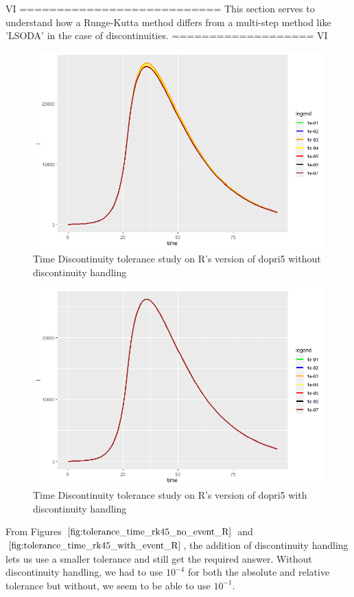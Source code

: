 VI ===========================
This section serves to understand how a Runge-Kutta method differs from a multi-step method like 'LSODA' in the case of discontinuities. 
=================== VI

\begin{figure}[h]
	\centering
	\includegraphics[width=0.7\linewidth]{./figures/tolerance_time_rk45_no_event_R}
	\caption{Time Discontinuity tolerance study on R's version of dopri5 without discontinuity handling}
	\label{fig:tolerance_time_rk45_no_event_R}
\end{figure}

\begin{figure}[h]
	\centering
	\includegraphics[width=0.7\linewidth]{./figures/tolerance_time_rk45_with_event_R}
	\caption{Time Discontinuity tolerance study on R's version of dopri5 with discontinuity handling}
	\label{fig:tolerance_time_rk45_with_event_R}
\end{figure}

From Figures $\ref{fig:tolerance_time_rk45_no_event_R}$ and $\ref{fig:tolerance_time_rk45_with_event_R}$, the addition of discontinuity handling lets us use a smaller tolerance and still get the required answer. Without discontinuity handling, we had to use $10^{-4}$ for both the absolute and relative tolerance but without, we seem to be able to use $10^{-1}$. 


